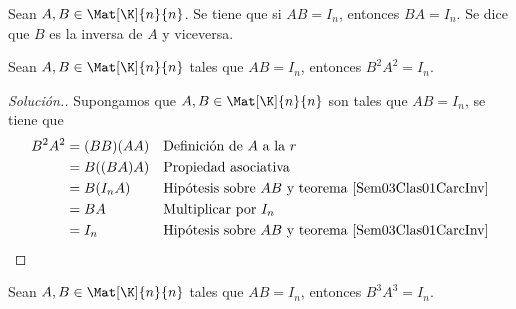 \documentclass[compacto,10pt]{pubciencias-notas}
\begin{document}

\begin{teo}\label{Sem03Clas01CarcInv}
    Sean $A, B \in \Mat[\K]{n}{n}$. Se tiene que si $AB=I_n$, entonces $BA=I_n$. Se dice que $B$ es la inversa de $A$ y viceversa.
\end{teo}

\begin{ejem}\hspace{0pt} 
Sean $A,B\in\Mat[\K]{n}{n}$ tales que $AB = I_{n}$, entonces $B^{2}A^{2} = I_{n}$.

\begin{proof}[Solución.]\hspace{0pt} Supongamos que $A,B\in\Mat[\K]{n}{n}$ son tales que $AB = I_{n}$, se tiene que
\begin{align*}
    B^{2}A^{2}
    &= (BB)(AA)
    && \text{Definición de $A$ a la $r$}\\
    &= B((BA)A)
    && \text{Propiedad asociativa}\\
    &= B(I_{n}A)
    && \text{Hipótesis sobre $AB$ y teorema \ref{Sem03Clas01CarcInv}}\\
    &= BA
    && \text{Multiplicar por $I_{n}$}\\
    &= I_{n}
    && \text{Hipótesis sobre $AB$ y teorema \ref{Sem03Clas01CarcInv}}\qedhere
\end{align*}
\end{proof}
\end{ejem}

\begin{ejer}\hspace{0pt} 
Sean $A,B\in\Mat[\K]{n}{n}$ tales que $AB = I_{n}$, entonces $B^{3}A^{3} = I_{n}$.
\end{ejer}
\end{document}
